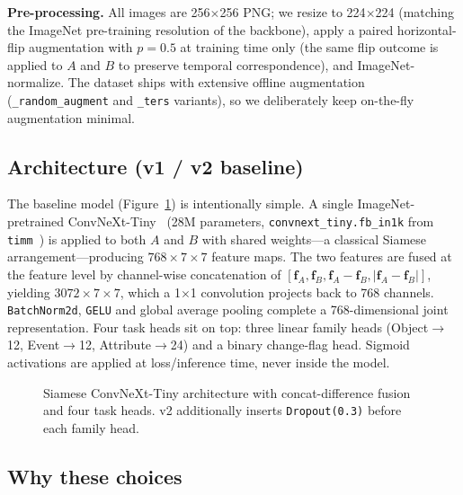 \documentclass[journal]{IEEEtran}
\begin{document}
\textbf{Pre-processing.} All images are 256$\times$256 PNG; we resize to 224$\times$224 (matching the ImageNet pre-training resolution of the backbone), apply a paired horizontal-flip augmentation with $p{=}0.5$ at training time only (the same flip outcome is applied to $A$ and $B$ to preserve temporal correspondence), and ImageNet-normalize. The dataset ships with extensive offline augmentation (\texttt{\_random\_augment} and \texttt{\_ters} variants), so we deliberately keep on-the-fly augmentation minimal.

\subsection{Architecture (v1 / v2 baseline)}\label{ssec:arch}

The baseline model (Figure~\ref{fig:architecture}) is intentionally simple. A single ImageNet-pretrained ConvNeXt-Tiny~\cite{liu2022convnext} (28M parameters, \texttt{convnext\_tiny.fb\_in1k} from \texttt{timm}~\cite{wightman2019timm}) is applied to both $A$ and $B$ with shared weights---a classical Siamese arrangement---producing $768{\times}7{\times}7$ feature maps. The two features are fused at the feature level by channel-wise concatenation of $[\mathbf{f}_A,\mathbf{f}_B,\mathbf{f}_A{-}\mathbf{f}_B,|\mathbf{f}_A{-}\mathbf{f}_B|]$, yielding $3072{\times}7{\times}7$, which a 1$\times$1 convolution projects back to 768 channels. \texttt{BatchNorm2d}, \texttt{GELU} and global average pooling complete a 768-dimensional joint representation. Four task heads sit on top: three linear family heads (Object$\to$12, Event$\to$12, Attribute$\to$24) and a binary change-flag head. Sigmoid activations are applied at loss/inference time, never inside the model.

\begin{figure}[!t]
  \centering
  \caption{Siamese ConvNeXt-Tiny architecture with concat-difference fusion and four task heads. v2 additionally inserts \texttt{Dropout(0.3)} before each family head.}
  \label{fig:architecture}
\end{figure}

\subsection{Why these choices}\label{ssec:why}
\end{document}
